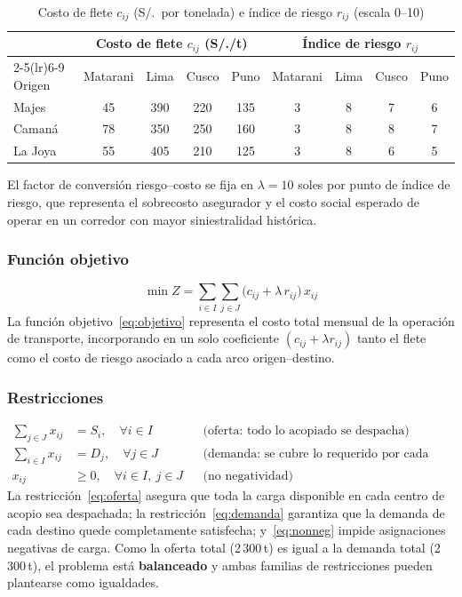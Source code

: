 \documentclass[11pt,a4paper]{article}
\begin{document}
\begin{table}[h]
\centering
\caption{Costo de flete $c_{ij}$ (S/.\ por tonelada) e \'indice de riesgo $r_{ij}$ (escala 0--10)}
\begin{tabular}{lcccccccc}
\toprule
 & \multicolumn{4}{c}{Costo de flete $c_{ij}$ (S/./t)} & \multicolumn{4}{c}{\'Indice de riesgo $r_{ij}$} \\
\cmidrule(lr){2-5}\cmidrule(lr){6-9}
Origen & Matarani & Lima & Cusco & Puno & Matarani & Lima & Cusco & Puno\\
\midrule
Majes    & 45 & 390 & 220 & 135 & 3 & 8 & 7 & 6 \\
Caman\'a & 78 & 350 & 250 & 160 & 3 & 8 & 8 & 7 \\
La Joya  & 55 & 405 & 210 & 125 & 3 & 8 & 6 & 5 \\
\bottomrule
\end{tabular}
\end{table}

\noindent El factor de conversi\'on riesgo--costo se fija en $\lambda = 10$ soles por punto de \'indice de riesgo, que representa el sobrecosto asegurador y el costo social esperado de operar en un corredor con mayor siniestralidad hist\'orica.

\subsubsection{Funci\'on objetivo}
\begin{equation}
\min Z = \sum_{i\in I}\sum_{j\in J} \big(c_{ij} + \lambda\, r_{ij}\big)\, x_{ij}
\label{eq:objetivo}
\end{equation}
La funci\'on objetivo~\eqref{eq:objetivo} representa el costo total mensual de la operaci\'on de transporte, incorporando en un solo coeficiente $(c_{ij}+\lambda r_{ij})$ tanto el flete como el costo de riesgo asociado a cada arco origen--destino.

\subsubsection{Restricciones}
\begin{align}
\sum_{j\in J} x_{ij} &= S_i, \quad \forall i\in I &&\text{(oferta: todo lo acopiado se despacha)}\label{eq:oferta}\\
\sum_{i\in I} x_{ij} &= D_j, \quad \forall j\in J &&\text{(demanda: se cubre lo requerido por cada destino)}\label{eq:demanda}\\
x_{ij} &\ge 0, \quad \forall i\in I,\ j\in J &&\text{(no negatividad)}\label{eq:nonneg}
\end{align}
La restricci\'on~\eqref{eq:oferta} asegura que toda la carga disponible en cada centro de acopio sea despachada; la restricci\'on~\eqref{eq:demanda} garantiza que la demanda de cada destino quede completamente satisfecha; y~\eqref{eq:nonneg} impide asignaciones negativas de carga. Como la oferta total (2\,300\,t) es igual a la demanda total (2\,300\,t), el problema est\'a \textbf{balanceado} y ambas familias de restricciones pueden plantearse como igualdades.
\end{document}
